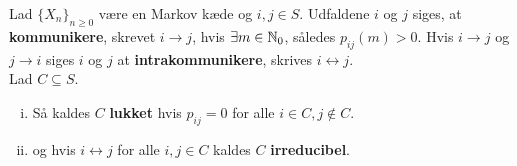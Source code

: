 \begin{defn}
Lad $\{X_n\}_{n \geq 0}$ være en Markov kæde og $i, j \in S$. Udfaldene $i$ og $j$ siges, at \textbf{kommunikere}, skrevet $i \to j$, hvis $\exists m \in \mathbb{N}_0$, således $p_{ij}(m) > 0$. Hvis $i \to j$ og $j \to i$ siges $i$ og $j$ at \textbf{intrakommunikere}, skrives $i \leftrightarrow j$.\\ Lad $C \subseteq S$.
\begin{enumerate}[i)]
    \item Så kaldes $C$ \textbf{lukket} hvis $p_{ij} = 0$ for alle $i \in C, j \not \in C$. 
    \item og hvis  $i \leftrightarrow j$ for alle $i, j \in C$ kaldes $C$ \textbf{irreducibel}.
\end{enumerate}
\end{defn}

